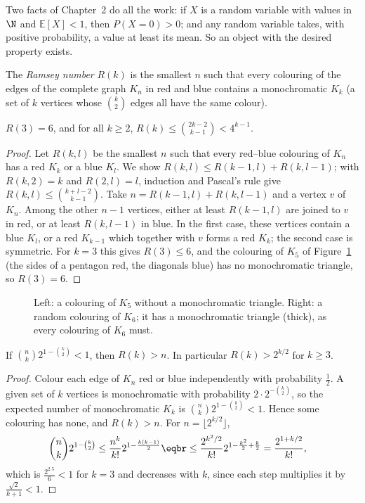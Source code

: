 Two facts of Chapter~2 do all the work: if $X$ is a random variable with values in $\N$ and $\mathbb E[X]<1$, then $P(X=0)>0$; and any random
variable takes, with positive probability, a value at least its mean. So an object with the desired property exists.

The \emph{Ramsey number} $R(k)$ is the smallest $n$ such that every colouring of the edges of the complete graph $K_n$ in red and blue
contains a monochromatic $K_k$ (a set of $k$ vertices whose $\binom k2$ edges all have the same colour).

\begin{proposition}\label{prop:ramseyupper}
$R(3)=6$, and for all $k\ge2$, $R(k)\le\binom{2k-2}{k-1}<4^{k-1}$.
\end{proposition}
\begin{proof}
Let $R(k,l)$ be the smallest $n$ such that every red--blue colouring of $K_n$ has a red $K_k$ or a blue $K_l$. We show $R(k,l)\le R(k-1,l)+R(k,l-1)$; with
$R(k,2)=k$ and $R(2,l)=l$, induction and Pascal's rule give $R(k,l)\le\binom{k+l-2}{k-1}$. Take $n=R(k-1,l)+R(k,l-1)$ and a vertex $v$ of $K_n$. Among the other
$n-1$ vertices, either at least $R(k-1,l)$ are joined to $v$ in red, or at least $R(k,l-1)$ in blue. In the first case, these vertices contain a blue $K_l$, or
a red $K_{k-1}$ which together with $v$ forms a red $K_k$; the second case is symmetric. For $k=3$ this gives $R(3)\le6$, and the colouring of $K_5$
of Figure~\ref{fig:ramsey} (the sides of a pentagon red, the diagonals blue) has no monochromatic triangle, so $R(3)=6$.
\end{proof}

\begin{figure}[ht]
\centering
{}
\caption{Left: a colouring of $K_5$ without a monochromatic triangle. Right: a random colouring of $K_6$; it has a monochromatic
triangle (thick), as every colouring of $K_6$ must.}
\label{fig:ramsey}
\end{figure}

\begin{theorem}[Erd\H os, 1947]\label{thm:erdosramsey}
If $\binom nk2^{1-\binom k2}<1$, then $R(k)>n$. In particular $R(k)>2^{k/2}$ for $k\ge3$.
\end{theorem}
\begin{proof}
Colour each edge of $K_n$ red or blue independently with probability $\frac12$. A given set of $k$ vertices is monochromatic with probability
$2\cdot2^{-\binom k2}$, so the expected number of monochromatic $K_k$ is $\binom nk2^{1-\binom k2}<1$. Hence some colouring has none, and $R(k)>n$. For $n=\lfloor2^{k/2}\rfloor$,
\[
\begin{aligned}\binom nk2^{1-\binom k2}&\le\frac{n^k}{k!}2^{1-\frac{k(k-1)}2}\eqbr\le\frac{2^{k^2/2}}{k!}2^{1-\frac{k^2}2+\frac k2}=\frac{2^{1+k/2}}{k!},\end{aligned}
\]
which is $\frac{2^{2.5}}6<1$ for $k=3$ and decreases with $k$, since each step multiplies it by $\frac{\sqrt2}{k+1}<1$.
\end{proof}

